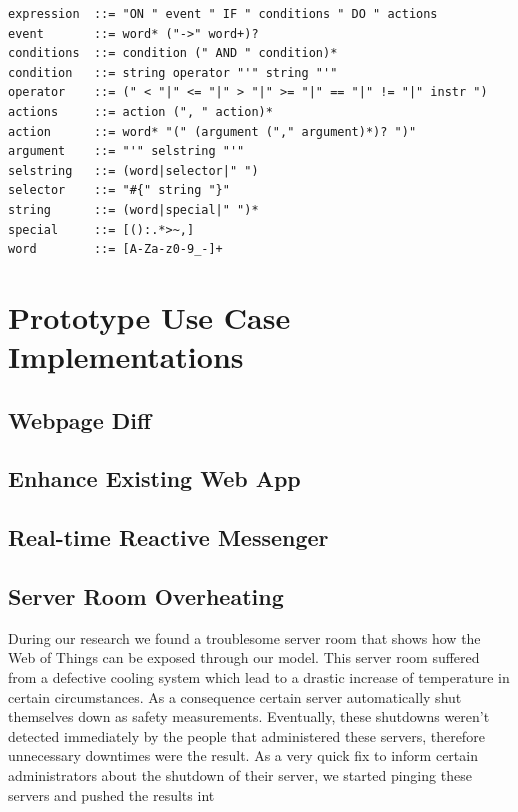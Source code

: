 \begin{lstlisting}[float=h,language=OwnRule,caption=Extended Backus-Naur Form of Prototype Rule Language Syntax]
expression  ::= "ON " event " IF " conditions " DO " actions
event       ::= word* ("->" word+)?
conditions  ::= condition (" AND " condition)*
condition   ::= string operator "'" string "'"
operator    ::= (" < "|" <= "|" > "|" >= "|" == "|" != "|" instr ")
actions     ::= action (", " action)*
action      ::= word* "(" (argument ("," argument)*)? ")"
argument    ::= "'" selstring "'"
selstring   ::= (word|selector|" ")
selector    ::= "#{" string "}"
string      ::= (word|special|" ")*
special     ::= [():.*>~,]
word        ::= [A-Za-z0-9_-]+
\end{lstlisting}





\section{Prototype Use Case Implementations}

\subsection{Webpage Diff}



\subsection{Enhance Existing Web App}



\subsection{Real-time Reactive Messenger}



\subsection{Server Room Overheating}

During our research we found a troublesome server room that shows how the \textrm{Web of Things} can be exposed through our model.
This server room suffered from a defective cooling system which lead to a drastic increase of temperature in certain circumstances.
As a consequence certain server automatically shut themselves down as safety measurements.
Eventually, these shutdowns weren't detected immediately by the people that administered these servers, therefore unnecessary downtimes were the result.
As a very quick fix to inform certain administrators about the shutdown of their server, we started pinging these servers and pushed the results int

